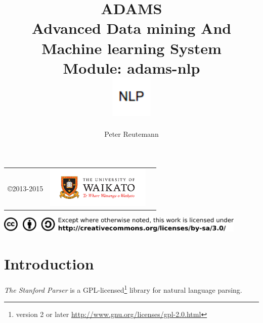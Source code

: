 \documentclass[a4paper]{book}
\title{
  \textbf{ADAMS} \\
  {\Large \textbf{A}dvanced \textbf{D}ata mining \textbf{A}nd \textbf{M}achine
  learning \textbf{S}ystem} \\
  {\Large Module: adams-nlp} \\
  \vspace{1cm}
  \includegraphics[width=2cm]{images/nlp-module.png} \\
}
\author{
  Peter Reutemann
}
\begin{document}
\begin{titlepage}
\maketitle

\thispagestyle{empty}
\center
\begin{table}[b]
	\begin{tabular}{c l l}
		\parbox[c][2cm]{2cm}{\copyright 2013-2015} &
		\parbox[c][2cm]{5cm}{\includegraphics[width=5cm]{images/coat_of_arms.pdf}} \\
	\end{tabular}
	\includegraphics[width=12cm]{images/cc.png} \\
\end{table}

\end{titlepage}

\tableofcontents
\listoffigures

\chapter{Introduction}
\textit{The Stanford Parser} is a GPL-licensed\footnote{version 2 or later \url{http://www.gnu.org/licenses/gpl-2.0.html}{}} 
library for natural language parsing.
\end{document}

